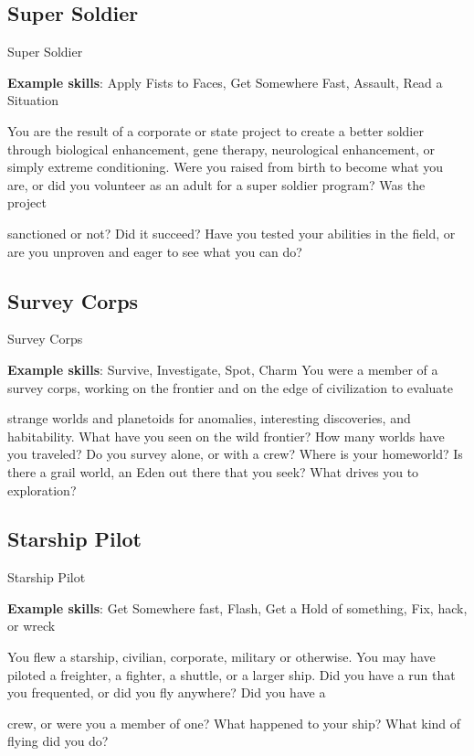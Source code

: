 \subsection{Super Soldier}
                                                 Super Soldier

\textbf{Example skills}: Apply Fists to Faces, Get Somewhere Fast, Assault, Read a Situation

You are the result of a corporate or state project to create a better soldier through biological enhancement,
gene therapy, neurological enhancement, or simply extreme conditioning. Were you raised from birth to
become what you are, or did you volunteer as an adult for a super soldier program? Was the project

sanctioned or not? Did it succeed? Have you tested your abilities in the field, or are you unproven and
eager to see what you can do?

\subsection{Survey Corps}
                                                 Survey Corps

\textbf{Example skills}: Survive, Investigate, Spot, Charm
You were a member of a survey corps, working on the frontier and on the edge of civilization to evaluate

strange worlds and planetoids for anomalies, interesting discoveries, and habitability. What have you seen
on the wild frontier? How many worlds have you traveled? Do you survey alone, or with a crew? Where is
your homeworld? Is there a grail world, an Eden out there that you seek? What drives you to exploration?

\subsection{Starship Pilot}
                                                 Starship Pilot

\textbf{Example skills}: Get Somewhere fast, Flash, Get a Hold of something, Fix, hack, or wreck

You flew a starship, civilian, corporate, military or otherwise. You may have piloted a freighter, a fighter, a
shuttle, or a larger ship. Did you have a run that you frequented, or did you fly anywhere? Did you have a

crew, or were you a member of one? What happened to your ship? What kind of flying did you do?

